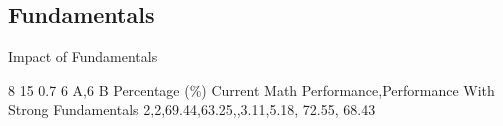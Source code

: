 \label{2.2 C6 A,6 BM Impact of Fundamentals}
\subsection{Fundamentals}
\renewcommand{\insertclass}{ - Class 6 A,6 B }
\renewcommand{\insertsubject}{- Math}

\begin{frame}{Impact of Fundamentals}


\centering
\impactOfFundamentals
    {8}
    {15}
    {0.7}
    {6 A,6 B}
    {Percentage (\%)}
    {Current Math Performance,Performance With Strong Fundamentals}
    {
        {2},{2},{69.44,63.25,},{3.11,5.18,}
    }
    {}
    {{72.55, 68.43}}


\end{frame}


%


        



